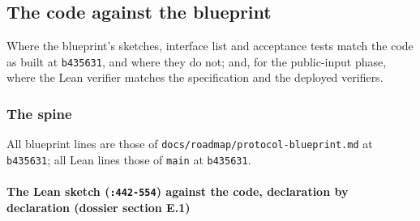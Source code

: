 \subsection{The code against the blueprint}\label{sec:gen-conf}

Where the blueprint's sketches, interface list and acceptance tests match the code as built at \texttt{b435631}, and where they do not; and, for the public-input phase, where the Lean verifier matches the specification and the deployed verifiers.

\subsubsection{The spine}\label{sec:gen-conf-spine}

\par{}\par

All blueprint lines are those of \texttt{d\allowbreak{}o\allowbreak{}c\allowbreak{}s\allowbreak{}/\allowbreak{}r\allowbreak{}o\allowbreak{}a\allowbreak{}d\allowbreak{}m\allowbreak{}a\allowbreak{}p\allowbreak{}/\allowbreak{}p\allowbreak{}r\allowbreak{}o\allowbreak{}t\allowbreak{}o\allowbreak{}c\allowbreak{}o\allowbreak{}l\allowbreak{}-{}\allowbreak{}b\allowbreak{}l\allowbreak{}u\allowbreak{}e\allowbreak{}p\allowbreak{}r\allowbreak{}i\allowbreak{}n\allowbreak{}t\allowbreak{}.\allowbreak{}m\allowbreak{}d} at \texttt{b435631}; all Lean lines those of \texttt{main} at \texttt{b435631}.

\paragraph{The Lean sketch (\texttt{:442-{}554}) against the code, declaration by declaration (dossier section E.1)}\label{sec:gen-spine-E1}


